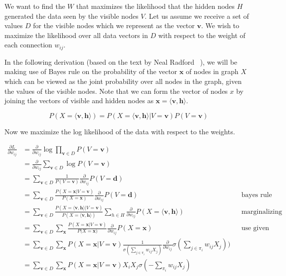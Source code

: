 \documentclass[11pt]{amsart}
\newcommand{\vek}[1]{\mathbf{#1}}
\begin{document}
We want to find the $W$ that maximizes the likelihood that the hidden nodes $H$ generated the data seen by the visible nodes $V$. Let us assume we receive a set of values $D$ for the visible nodes which we represent as the vector $\vek{v}$. We wish to maximize the likelihood over all data vectors in $D$ with respect to the weight of each connection $w_{ij}$.

In the following derivation (based on the text by Neal Radford ~\cite{neal1992connectionist}), we will be making use of Bayes rule on the probability of the vector $\vek{x}$ of nodes in graph $X$ which can be viewed as the joint probability over all nodes in the graph, given the values of the visible nodes. Note that we can form the vector of nodes $x$ by joining the vectors of visible and hidden nodes as $\vek{x} = \langle \vek{v}, \vek{h} \rangle$.

\begin{equation}
P(X= \langle \vek{v}, \vek{h} \rangle) = P(X = \langle \vek{v}, \vek{h} \rangle \vert V = \vek{v}) P(V = \vek{v})
\end{equation}

Now we maximize the log likelihood of the data with respect to the weights.

\begin{equation}
\begin{aligned}
\frac{\partial L}{\partial w_{ij}} &= \frac{\partial}{\partial w_{ij}} \log \prod_{\vek{v} \in D} P(V = \vek{v}) \\
						 & =  \frac{\partial}{\partial w_{ij}} \sum_{\vek{v} \in D} \log P(V = \vek{v}) \\
						 & =  \sum_{\vek{v} \in D}  \frac{1}{P(V = \vek{v})} \frac{\partial}{\partial w_{ij}} P(V = \vek{d}) \\
						 & =  \sum_{\vek{v} \in D}  \frac{P(X = \vek{x} \vert V = \vek{v})}{P(X = \vek{x})} \frac{\partial}{\partial w_{ij}} P(V = \vek{d}) && \text{bayes rule}\\
						 & = \sum_{\vek{v} \in D}  \frac{P(X = \langle \vek{v}, \vek{h} \rangle \vert V = \vek{v})}{P(X = \langle \vek{v}, \vek{h} \rangle)}  \sum_{h \in H} \frac{\partial}{\partial w_{ij}} P(X=\langle \vek{v}, \vek{h} \rangle) && \text{marginalizing over H} \\
						 & = \sum_{\vek{v} \in D}   \sum_{\vek{x}} \frac{P(X = \vek{x}  \vert V = \vek{v})}{P(X = \vek{x)}}  \frac{\partial}{\partial w_{ij}} P(X=\vek{x}) && \text{use given parametrization} \\
						 & = \sum_{\vek{v} \in D}   \sum_{\vek{x}} P(X = \vek{x}  \vert V = \vek{v}) \frac{1}{\sigma(\sum_{j \in \pi_i} w_{ij}X_j)} \frac{\partial}{\partial w_{ij}} \sigma( \sum_{j \in \pi_i} w_{ij}X_j)) \\
						 & = \sum_{\vek{v} \in D}   \sum_{\vek{x}} P(X = \vek{x}  \vert V = \vek{v}) X_{i} X_{j} \sigma(- \sum_{\pi_i} w_{ij} X_{j})
\end{aligned}
\end{equation}
\end{document}
